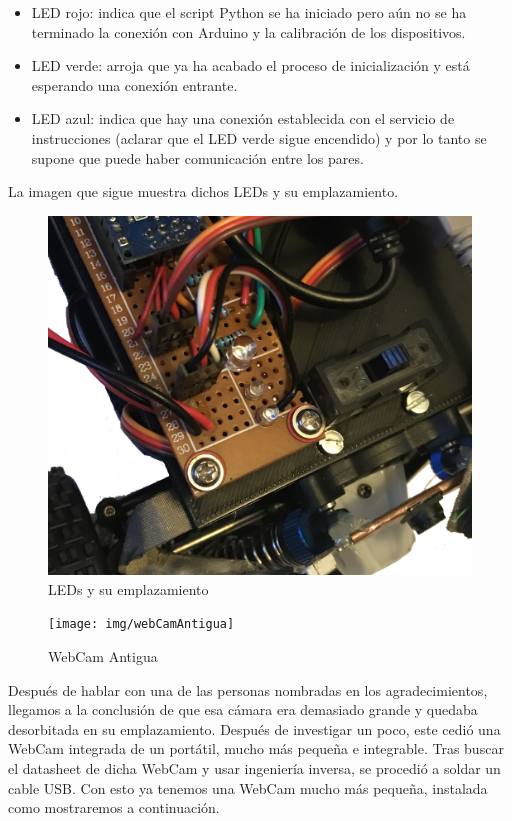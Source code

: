 \documentclass{pclass}
\begin{document}
\begin{itemize}
\begin{itemize}
	\item LED rojo: indica que el script Python se ha iniciado pero aún no se ha terminado la conexión con Arduino y la calibración de los dispositivos.
	\item LED verde: arroja que ya ha acabado el proceso de inicialización y está esperando una conexión entrante.
	\item LED azul: indica que hay una conexión establecida con el servicio de instrucciones (aclarar que el LED verde sigue encendido) y por lo tanto se supone que puede haber comunicación entre los pares.
	
\end{itemize}

\clearpage
La imagen que sigue muestra dichos LEDs y su emplazamiento.

\begin{figure}[H]
	\centering
	\includegraphics[angle=270,width=1\textwidth]{img/leds}
	\caption{LEDs y su emplazamiento}
	\label{fig:leds}
\end{figure}



\begin{figure}[H]
	\centering
	\texttt{[image: img/webCamAntigua]}
	\caption{WebCam Antigua}
	\label{fig:webcamvieja}
\end{figure}

Después de hablar con una de las personas nombradas en los agradecimientos, llegamos a la conclusión de que esa cámara era demasiado grande y quedaba desorbitada en su emplazamiento. Después de investigar un poco, este cedió una WebCam integrada de un portátil, mucho más pequeña e integrable. Tras buscar el datasheet de dicha WebCam y usar ingeniería inversa, se procedió a soldar un cable USB. Con esto ya tenemos una WebCam mucho más pequeña, instalada como mostraremos a continuación.


\end{itemize}
\end{document}
